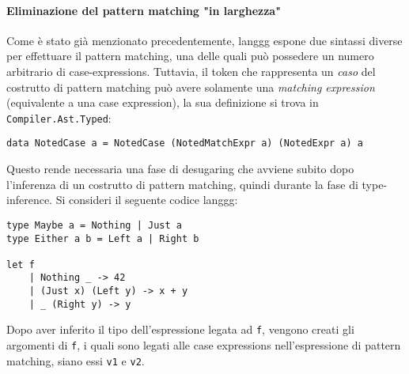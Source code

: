 \documentclass[10pt,a4paper]{article}
\begin{document}
\paragraph{Eliminazione del pattern matching "in larghezza"}
Come è stato già menzionato precedentemente, langgg espone due sintassi diverse per effettuare il pattern matching,
una delle quali può possedere un numero arbitrario di case-expressions. Tuttavia, il token che rappresenta un
\textit{caso} del costrutto di pattern matching può avere solamente una \textit{matching expression} (equivalente
a una case expression), la sua definizione si trova in \texttt{Compiler.Ast.Typed}:
\begin{lstlisting}
data NotedCase a = NotedCase (NotedMatchExpr a) (NotedExpr a) a
\end{lstlisting}
Questo rende necessaria una fase di desugaring che avviene subito dopo l'inferenza di un costrutto di pattern matching,
quindi durante la fase di type-inference. Si consideri il seguente codice langgg:
\begin{lstlisting}
type Maybe a = Nothing | Just a
type Either a b = Left a | Right b

let f
    | Nothing _ -> 42
    | (Just x) (Left y) -> x + y
    | _ (Right y) -> y
\end{lstlisting}
Dopo aver inferito il tipo dell'espressione legata ad \texttt{f}, vengono creati gli argomenti di \texttt{f}, i quali
sono legati alle case expressions nell'espressione di pattern matching, siano essi \texttt{v1} e \texttt{v2}. %
\begin{lstlisting}
\end{lstlisting}
\end{document}
